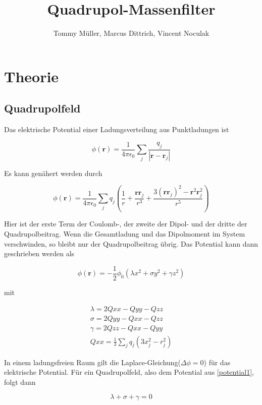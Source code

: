 \documentclass[10pt,a4paper]{article}
\author{Tommy Müller, Marcus Dittrich, Vincent Noculak}
\title{Quadrupol-Massenfilter}
\begin{document}
\section{Theorie}

\subsection{Quadrupolfeld}

Das elektrische Potential einer Ladungsverteilung aus Punktladungen ist

\begin{equation}
	\phi(\textbf{r}) = \frac{1}{4 \pi \epsilon_0} \sum_{j} \frac{q_j}{|\textbf{r}-\textbf{r}_j|}
\end{equation}

Es kann genähert werden durch

\begin{equation}
	\phi(\textbf{r}) = \frac{1}{4 \pi \epsilon_0} \sum_{j} q_j (\frac{1}{r} + \frac{\textbf{r} \textbf{r}_j}{r^3} + \frac{3(\textbf{r}\textbf{r}_j)^2 - \textbf{r}^2 \textbf{r}^2_j}{r^5})
\end{equation}

Hier ist der erste Term der Coulomb-, der zweite der Dipol- und der dritte der Quadrupolbeitrag. Wenn die Gesamtladung und das Dipolmoment im System verschwinden, so bleibt nur der Quadrupolbeitrag übrig. Das Potential kann dann geschrieben werden als

\begin{equation}
	\phi(\textbf{r}) =  - \frac{1}{2} \phi _0 (\lambda x^2 + \sigma y^2 + \gamma z^2)
	\label{potential1}
\end{equation}

mit

\begin{align}
	\lambda = 2 Q{xx} -Q{yy}-Q{zz}\\
	\sigma = 2 Q{yy}-Q{xx}-Q{zz}\\
	\gamma = 2 Q{zz}-Q{xx}-Q{yy}\\
	Q{xx} = \frac{1}{3} \sum_{j} q_j (3 x_j^2 - r_j^2)
\end{align}

In einem ladungsfreien Raum gilt die Laplace-Gleichung($\Delta \phi = 0$) für das elektrische Potential. Für ein Quadrupolfeld, also dem Potential aus \eqref{potential1}, folgt dann

\begin{equation}
	\lambda + \sigma + \gamma = 0
\end{equation}
\end{document}
